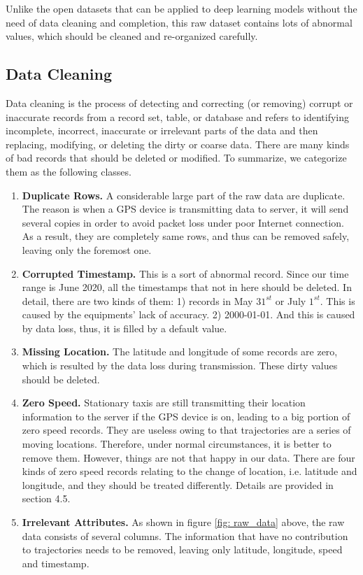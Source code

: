 Unlike the open datasets that can be applied to deep learning models without the need of data cleaning and completion, this raw dataset contains lots of abnormal values, which should be cleaned and re-organized carefully.

\subsection{Data Cleaning}
Data cleaning is the process of detecting and correcting (or removing) corrupt or inaccurate records from a record set, table, or database and refers to identifying incomplete, incorrect, inaccurate or irrelevant parts of the data and then replacing, modifying, or deleting the dirty or coarse data\cite{data_cleaning}. There are many kinds of bad records that should be deleted or modified. To summarize, we categorize them as the following classes.

\begin{enumerate}
  \item \textbf{Duplicate Rows.} A considerable large part of the raw data are duplicate. The reason is when a GPS device is transmitting data to server, it will send several copies in order to avoid packet loss under poor Internet connection. As a result, they are completely same rows, and thus can be removed safely, leaving only the foremost one.
  \item \textbf{Corrupted Timestamp.} This is a sort of abnormal record. Since our time range is June 2020, all the timestamps that not in here should be deleted. In detail, there are two kinds of them: 1) records in May $31^{st}$ or July $1^{st}$. This is caused by the equipments' lack of accuracy. 2) 2000-01-01. And this is caused by data loss, thus, it is filled by a default value.
  \item \textbf{Missing Location.} The latitude and longitude of some records are zero, which is resulted by the data loss during transmission. These dirty values should be deleted.
  \item \textbf{Zero Speed.} Stationary taxis are still transmitting their location information to the server if the GPS device is on, leading to a big portion of zero speed records. They are useless owing to that trajectories are a series of moving locations. Therefore, under normal circumstances, it is better to remove them. However, things are not that happy in our data. There are four kinds of zero speed records relating to the change of location, i.e. latitude and longitude, and they should be treated differently. Details are provided in section 4.5.
  \item \textbf{Irrelevant Attributes.} As shown in figure \ref{fig: raw_data} above, the raw data consists of several columns. The information that have no contribution to trajectories needs to be removed, leaving only latitude, longitude, speed and timestamp.
\end{enumerate}

